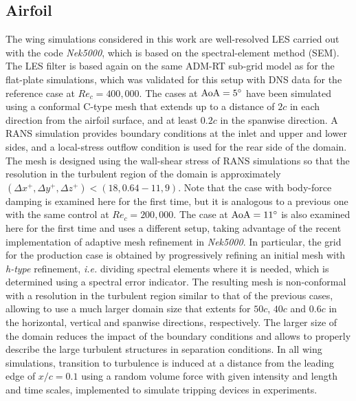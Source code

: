 \subsection{Airfoil}
The wing simulations considered in this work are well-resolved LES carried out with the code \textit{Nek5000}\cite{fischer2008nek5000}, which is based on the spectral-element method\cite{pate84} (SEM). 
The LES filter is based again on the same ADM-RT sub-grid model\cite{schl04} as for the flat-plate simulations, which was validated for this setup with DNS data\cite{hoss16} for the reference case at $Re_c=400,000$. The cases at ${\rm AoA}=5^\circ$ have been simulated using a conformal C-type mesh that extends up to a distance of $2c$ in each direction from the airfoil surface, and at least $0.2c$ in the spanwise direction\cite{vinu18b,atzo21b}. A RANS simulation provides boundary conditions at the inlet and upper and lower sides, and a local-stress outflow condition is used for the rear side of the domain\cite{dong14}. The mesh is designed using the wall-shear stress of RANS simulations so that the resolution in the turbulent region of the domain is approximately $(\Delta x^+,\Delta y^+,\Delta z^+) < (18,0.64-11,9)$. Note that the case with body-force damping is examined here for the first time, but it is analogous to a previous one with the same control at $Re_c=200,000$\cite{atzo21b}. The case at ${\rm AoA}=11^\circ$ is also examined here for the first time and uses a different setup, taking advantage of the recent implementation of adaptive mesh refinement in \textit{Nek5000}\cite{tanarro2020enabling}. In particular, the grid for the production case is obtained by progressively refining an initial mesh with \textit{h-type} refinement, \textit{i.e.} dividing spectral elements where it is needed, which is determined using a spectral error indicator\cite{mavr90}. The resulting mesh is non-conformal with a resolution in the turbulent region similar to that of the previous cases, allowing to use a much larger domain size that extents for $50c$, $40c$ and $0.6c$ in the horizontal, vertical and spanwise directions, respectively. The larger size of the domain reduces the impact of the boundary conditions and allows to properly describe the large turbulent structures in separation conditions. In all wing simulations, transition to turbulence is induced at a distance from the leading edge of $x/c=0.1$ using a random volume force with given intensity and length and time scales, implemented to simulate tripping devices in experiments\cite{schl12}. 

